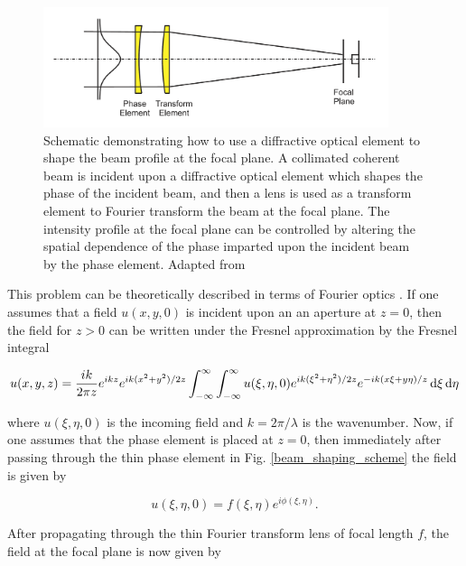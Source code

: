 \begin{figure}
	\centering
	\includegraphics[width=0.9\textwidth]{figures/Two_source/romero_beam_shaping_schematic.png}
	\caption{Schematic demonstrating how to use a diffractive optical element to shape the beam profile at the focal plane. A collimated coherent beam is incident upon a diffractive optical element which shapes the phase of the incident beam, and then a lens is used as a transform element to Fourier transform the beam at the focal plane.  The intensity profile at the focal plane can be controlled by altering the spatial dependence of the phase imparted upon the incident beam by the phase element. Adapted from \cite{romeroMathematicalAspectsLaser2010}}
	\label{fig:beam_shaping_scheme}
\end{figure}


This problem can be theoretically described in terms of Fourier optics \cite{dickeyLaserBeamShaping2000, romeroMathematicalAspectsLaser2010, goodmanIntroductionFourierOptics2005}.  If one assumes that a field $u(x,y,0)$ is incident upon an an aperture at $z=0$, then the field for $z>0$ can be written under the Fresnel approximation by the Fresnel integral

\begin{equation}
\label{fresnel_integral}
	u(x,y,z)=\frac{i k}{2\pi z}e^{i k z}e^{i k (x^2+y^2)/2z}\int_{-\infty}^{\infty}\int_{-\infty}^{\infty}u(\xi,\eta,0) e^{ik(\xi^{2}+\eta^{2})/2z} e^{-ik(x\xi + y\eta)/z} \mathop{}\!\mathrm{d}\xi\mathop{}\!\mathrm{d}\eta
\end{equation}

where $u(\xi,\eta,0)$ is the incoming field and $k=2\pi/\lambda$ is the wavenumber.  Now, if one assumes that the phase element is placed at $z=0$, then immediately after passing through the thin phase element in Fig. \ref{beam_shaping_scheme} the field is given by

\begin{equation}
	u(\xi,\eta,0)=f(\xi,\eta)e^{i\phi(\xi,\eta)}.
\end{equation} 

After propagating through the thin Fourier transform lens of focal length $f$, the field at the focal plane is now given by

